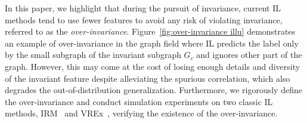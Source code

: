 In this paper,  
we highlight that during the pursuit of invariance, current IL methods tend to use fewer features to avoid any risk of violating invariance, referred to as the \textit{over-invariance}.
Figure~\ref{fig:over-invariance illu} demonstrates an example of over-invariance in the graph field where IL predicts the label only by the small subgraph of the invariant subgraph $G_c$ and ignores other part of the graph.
However, this may come at the cost of losing enough details and diversity of the invariant feature despite alleviating the spurious correlation, which also degrades the out-of-distribution generalization.
Furthermore, we rigorously define the over-invariance and conduct simulation experiments on two classic IL methods, IRM~\citep{irmv1} and VREx~\citep{v-rex}, verifying the existence of the over-invariance.

